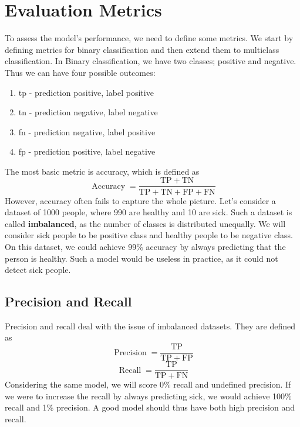 \section{Evaluation Metrics}
\label{sec:metrics}
To assess the model's performance, we need to define some metrics.
We start by defining metrics for binary classification and then extend them to multiclass classification.
In Binary classification, we have two classes; positive and negative. Thus we can have four possible outcomes:
\begin{enumerate}
    \item \ac{tp} - prediction positive, label positive
    \item \ac{tn} - prediction negative, label negative
    \item \ac{fn} - prediction negative, label positive
    \item \ac{fp} - prediction positive, label negative
\end{enumerate}

The most basic metric is accuracy, which is defined as
\begin{equation}
    \label{eq:accuracy}
    \operatorname{Accuracy} = \frac{\mathrm{TP} + \mathrm{TN}}{\mathrm{TP} + \mathrm{TN} + \mathrm{FP} + \mathrm{FN}}
\end{equation}
However, accuracy often fails to capture the whole picture.
Let's consider a dataset of 1000 people, where 990 are healthy and 10 are sick.
Such a dataset is called \textbf{imbalanced}, as the number of classes is distributed unequally.
We will consider sick people to be positive class and healthy people to be negative class.
On this dataset, we could achieve 99\% accuracy by always predicting that the person is healthy.
Such a model would be useless in practice, as it could not detect sick people.

\subsection{Precision and Recall}
Precision and recall deal with the issue of imbalanced datasets.
They are defined as
\begin{equation}
    \label{eq:precision}
    \operatorname{Precision} = \frac{\mathrm{TP}}{\mathrm{TP} + \mathrm{FP}}
\end{equation}
\begin{equation}
    \label{eq:recall}
    \operatorname{Recall} = \frac{\mathrm{TP}}{\mathrm{TP} + \mathrm{FN}}
\end{equation}
Considering the same model, we will score 0\% recall and undefined precision.
If we were to increase the recall by always predicting sick, we would achieve 100\% recall and 1\% precision.
A good model should thus have both high precision and recall.

